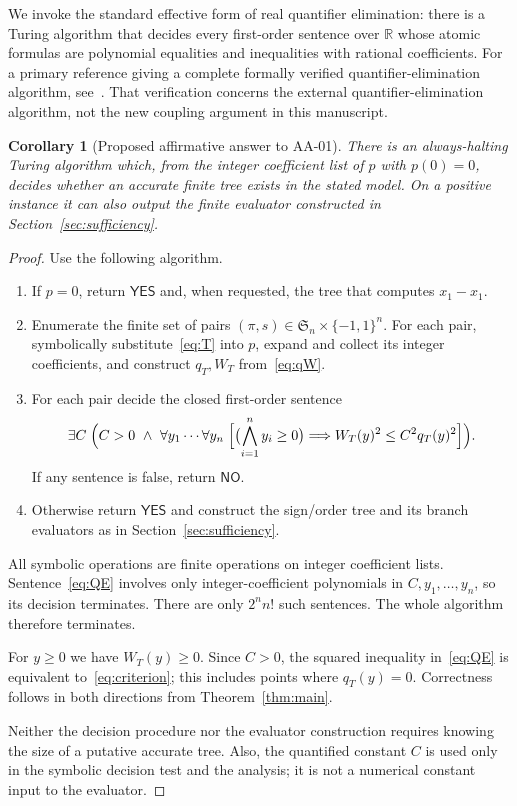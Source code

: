 \documentclass[11pt,a4paper]{article}
\numberwithin{equation}{section}
\newtheorem{corollary}[theorem]{Corollary}
\theoremstyle{definition}
\theoremstyle{remark}
\newcommand{\R}{\mathbb R}
\newcommand{\Sn}{\mathfrak S_n}
\newcommand{\YES}{\mathsf{YES}}
\newcommand{\NO}{\mathsf{NO}}
\begin{document}
We invoke the standard effective form of real quantifier elimination:
there is a Turing algorithm that decides every first-order sentence over
$\R$ whose atomic formulas are polynomial equalities and inequalities
with rational coefficients.  For a primary reference giving a complete
formally verified quantifier-elimination algorithm, see~\cite{KTP23}.
That verification concerns the external quantifier-elimination algorithm,
not the new coupling argument in this manuscript.

\begin{corollary}[Proposed affirmative answer to AA-01]
\label{cor:decision}
There is an always-halting Turing algorithm which, from the integer
coefficient list of $p$ with $p(0)=0$, decides whether an accurate finite
tree exists in the stated model.  On a positive instance it can also
output the finite evaluator constructed in Section~\ref{sec:sufficiency}.
\end{corollary}

\begin{proof}
Use the following algorithm.
\begin{enumerate}[label=\arabic*.]
\item If $p=0$, return $\YES$ and, when requested, the tree that computes
$x_1-x_1$.
\item Enumerate the finite set of pairs
$(\pi,s)\in\Sn\times\{-1,1\}^n$.
For each pair, symbolically substitute~\eqref{eq:T} into $p$, expand and
collect its integer coefficients, and construct $q_T,W_T$
from~\eqref{eq:qW}.
\item For each pair decide the closed first-order sentence
\begin{equation}\label{eq:QE}
 \exists C\;\Bigl(C>0\ \wedge\
 \forall y_1\cdots\forall y_n\;
 \Bigl[
  \bigl(\bigwedge_{i=1}^n y_i\ge0\bigr)
  \Longrightarrow
  W_T(y)^2\le C^2 q_T(y)^2
 \Bigr]\Bigr).
\end{equation}
If any sentence is false, return $\NO$.
\item Otherwise return $\YES$ and construct the sign/order tree and its
branch evaluators as in Section~\ref{sec:sufficiency}.
\end{enumerate}
All symbolic operations are finite operations on integer coefficient
lists.  Sentence~\eqref{eq:QE} involves only integer-coefficient
polynomials in $C,y_1,\ldots,y_n$, so its decision terminates.  There are
only $2^n n!$ such sentences.  The whole algorithm therefore terminates.

For $y\ge0$ we have $W_T(y)\ge0$.  Since $C>0$, the squared inequality
in~\eqref{eq:QE} is equivalent to~\eqref{eq:criterion}; this includes
points where $q_T(y)=0$.  Correctness follows in both directions from
Theorem~\ref{thm:main}.

Neither the decision procedure nor the evaluator construction requires
knowing the size of a putative accurate tree.  Also, the quantified
constant $C$ is used only in the symbolic decision test and the analysis;
it is not a numerical constant input to the evaluator.
\end{proof}
\end{document}
